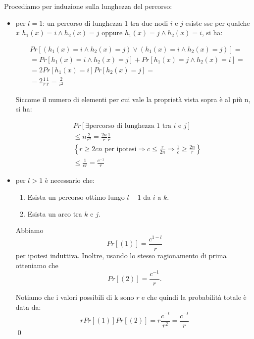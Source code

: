 \begin{proof*}
    Procediamo per induzione sulla lunghezza del percorso:
    \begin{itemize}
    \item per $l = 1$: un percorso di lunghezza 1 tra due nodi $i$ e $j$ esiste
    sse per qualche $x$ $h_1(x) = i \land h_2(x) = j$ oppure $h_1(x) = j \land
    h_2(x) = i$, si ha:
    
    \begin{align}
        &Pr\left[(h_1(x) = i \land h_2(x) = j) \lor (h_1(x) = i \land h_2(x) = j) \right] = \nonumber \\
        &= Pr\left[h_1(x) = i \land h_2(x) = j\right] + Pr\left[h_1(x) = j \land h_2(x) = i\right] = \nonumber \\
        &= 2 Pr\left[h_1(x) = i\right]Pr\left[h_2(x) = j\right] = \nonumber \\
        &= 2 \frac{1}{r} \frac{1}{r} = \frac{2}{r^2} \nonumber
    \end{align}

    Siccome il numero di elementi per cui vale la proprietà vista sopra è al
    più n, si ha:

    \begin{align}
        & Pr\left[\exists \mbox{percorso di lunghezza 1 tra $i$ e $j$}\right] \nonumber \\
        &\le n \frac{2}{r^2} = \frac{2n}{r} \frac{1}{r} \nonumber \\
        &\left\{r \ge 2cn \mbox{ per ipotesi} \Rightarrow c \le \frac{r}{2n}
            \Rightarrow \frac{1}{c} \ge \frac{2n}{r} \right\} \nonumber \\
        &\le \frac {1}{cr} = \frac{c^{-1}}{r} \nonumber
    \end{align}

    \item per $l > 1$ è necessario che:
        \begin{enumerate}
            \item Esista un percorso ottimo lungo $l-1$ da $i$ a $k$.
            \item Esista un arco tra $k$ e $j$.
        \end{enumerate}
        Abbiamo
            \[Pr[(1)] = \frac{c^{1-l}}{r}\]
        per ipotesi induttiva. Inoltre, usando lo stesso ragionamento di prima
        otteniamo che
            \[Pr[(2)]= \frac{c^{-1}}{r}.\]

        Notiamo che i valori possibili di k sono $r$ e che quindi la probabilità
        totale è data da:
        \[r Pr[(1)]Pr[(2)] = r\frac{c^{-l}}{r^2} = \frac{c^{-l}}{r}\] \qed
    \end{itemize}
\end{proof*}

